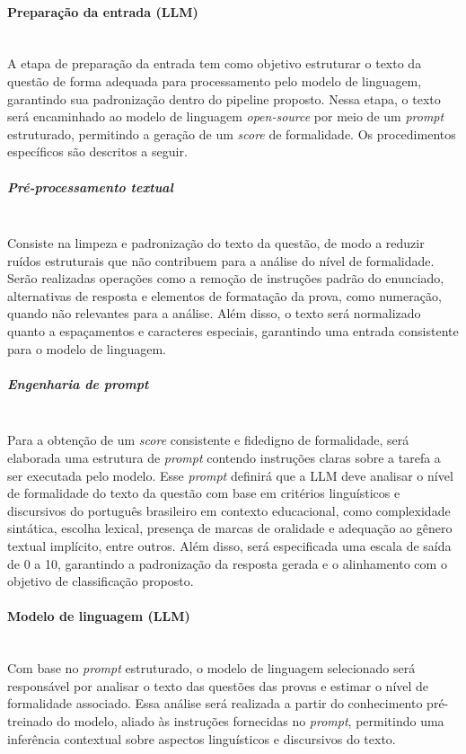 \documentclass[a4paper,10pt, twocolumn]{article}
\begin{document}
\paragraph{Preparação da entrada (LLM)}
\mbox{}\\
A etapa de preparação da entrada tem como objetivo estruturar o texto da questão de forma adequada para processamento pelo modelo de linguagem, garantindo sua padronização dentro do pipeline proposto. Nessa etapa, o texto será encaminhado ao modelo de linguagem  \textit{open-source} por meio de um \textit{prompt} estruturado, permitindo a geração de um \textit{score} de formalidade. Os procedimentos específicos são descritos a seguir.

\subparagraph{Pré-processamento textual}
\mbox{}\\
Consiste na limpeza e padronização do texto da questão, de modo a reduzir ruídos estruturais que não contribuem para a análise do nível de formalidade. Serão realizadas operações como a remoção de instruções padrão do enunciado, alternativas de resposta e elementos de formatação da prova, como numeração, quando não relevantes para a análise. Além disso, o texto será normalizado quanto a espaçamentos e caracteres especiais, garantindo uma entrada consistente para o modelo de linguagem.

\subparagraph{Engenharia de \textit{prompt}}
\mbox{}\\
Para a obtenção de um \textit{score} consistente e fidedigno de formalidade, será elaborada uma estrutura de \textit{prompt} contendo instruções claras sobre a tarefa a ser executada pelo modelo. Esse \textit{prompt} definirá que a LLM deve analisar o nível de formalidade do texto da questão com base em critérios linguísticos e discursivos do português brasileiro em contexto educacional, como complexidade sintática, escolha lexical, presença de marcas de oralidade e adequação ao gênero textual implícito, entre outros. Além disso, será especificada uma escala de saída de 0 a 10, garantindo a padronização da resposta gerada e o alinhamento com o objetivo de classificação proposto.

\paragraph{Modelo de linguagem (LLM)}
\mbox{}\\
Com base no \textit{prompt} estruturado, o modelo de linguagem selecionado será responsável por analisar o texto das questões das provas e estimar o nível de formalidade associado. Essa análise será realizada a partir do conhecimento pré-treinado do modelo, aliado às instruções fornecidas no \textit{prompt}, permitindo uma inferência contextual sobre aspectos linguísticos e discursivos do texto.
\end{document}
